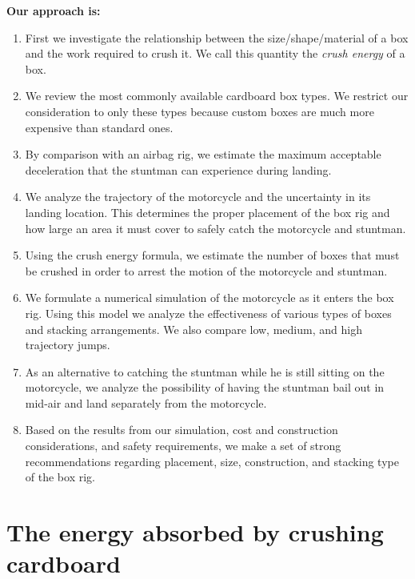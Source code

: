 \documentclass[12pt,a4paper,titlepage]{article}
\begin{document}
{\bf Our approach is:}
\begin{enumerate}

\item First we investigate the relationship between the size/shape/material of a box and the work required to
crush it.  We call this quantity the {\it crush energy} of a box.

\item We review the most commonly available cardboard box types.  We restrict our consideration to only
these types because custom boxes are much more expensive than standard ones.

\item By comparison with an airbag rig, we estimate the maximum acceptable deceleration that the stuntman
can experience during landing.

\item We analyze the trajectory of the motorcycle and the uncertainty in its landing location.  This determines the
proper placement of the box rig and how large an area it must cover to safely catch the motorcycle and stuntman.

\item Using the crush energy formula, we estimate the number of boxes that must be crushed in order to
arrest the motion of the motorcycle and stuntman.

\item We formulate a numerical simulation of the motorcycle as it enters the box rig.  Using this model we
analyze the effectiveness of various types of boxes and stacking arrangements.  We also compare low, medium,
and high trajectory jumps.

\item As an alternative to catching the stuntman while he is still sitting on the motorcycle, we analyze
the possibility of having the stuntman bail out in mid-air and land separately from the motorcycle.

\item Based on the results from our simulation, cost and construction considerations, and safety requirements,
we make a set of strong recommendations regarding placement, size, construction, and stacking type of the box rig.

\end{enumerate}


\section{The energy absorbed by crushing cardboard}
\end{document}
